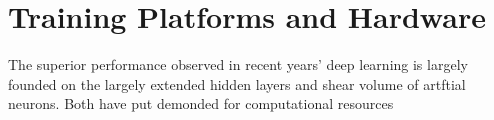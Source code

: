 \section{Training Platforms and Hardware}
The superior performance observed in recent years' deep learning is largely founded on the largely extended hidden layers and shear volume of artftial neurons. Both have put demonded for computational resources 